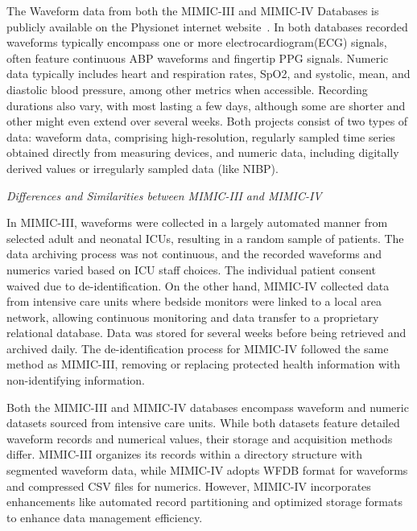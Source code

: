 The Waveform data from both the MIMIC-III and MIMIC-IV Databases is publicly available on the Physionet internet website~\cite{moodyMIMICIIIWaveformDatabase2017, moodyMIMICIVWaveformDatabase}.
In both databases recorded waveforms typically encompass one or more electrocardiogram(ECG) signals, often feature continuous ABP waveforms and fingertip PPG signals.
Numeric data typically includes heart and respiration rates, SpO2, and systolic, mean, and diastolic blood pressure, among other metrics when accessible.
Recording durations also vary, with most lasting a few days, although some are shorter and other might even extend over several weeks.
Both projects consist of two types of data: waveform data, comprising high-resolution, regularly sampled time series obtained directly from measuring devices, and numeric data, including digitally derived values or irregularly sampled data (like NIBP).

\vspace{0.2cm}
\textit{Differences and Similarities between MIMIC-III and MIMIC-IV}
\vspace{0.2cm}

In MIMIC-III, waveforms were collected in a largely automated manner from selected adult and neonatal ICUs, resulting in a random sample of patients.
The data archiving process was not continuous, and the recorded waveforms and numerics varied based on ICU staff choices.
The individual patient consent waived due to de-identification.
On the other hand, MIMIC-IV collected data from intensive care units where bedside monitors were linked to a local area network, allowing continuous monitoring and data transfer to a proprietary relational database.
Data was stored for several weeks before being retrieved and archived daily.
The de-identification process for MIMIC-IV followed the same method as MIMIC-III, removing or replacing protected health information with non-identifying information.

Both the MIMIC-III and MIMIC-IV databases encompass waveform and numeric datasets sourced from intensive care units.
While both datasets feature detailed waveform records and numerical values, their storage and acquisition methods differ.
MIMIC-III organizes its records within a directory structure with segmented waveform data, while MIMIC-IV adopts WFDB format for waveforms and compressed CSV files for numerics.
However, MIMIC-IV incorporates enhancements like automated record partitioning and optimized storage formats to enhance data management efficiency.

